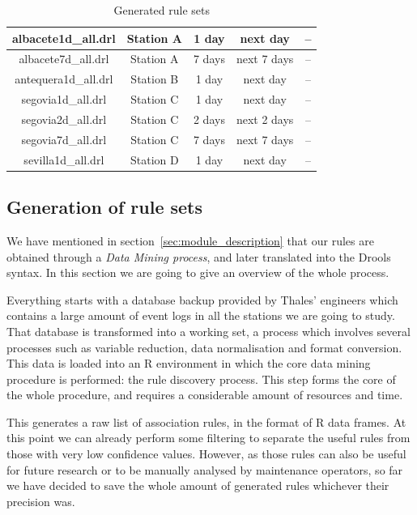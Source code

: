\begin{table}
\begin{center}
\begin{tabular}{|c|c|c|c|c|}
\hline
albacete1d\_all.drl & Station A & 1 day & next day & -- \\ 
\hline  
albacete7d\_all.drl & Station A & 7 days & next 7 days & -- \\ 
\hline 
antequera1d\_all.drl & Station B & 1 day & next day & -- \\ 
\hline 
segovia1d\_all.drl & Station C & 1 day & next day & -- \\ 
\hline
segovia2d\_all.drl & Station C & 2 days & next 2 days & -- \\  
\hline 
segovia7d\_all.drl & Station C & 7 days & next 7 days & -- \\  
\hline 
sevilla1d\_all.drl & Station D & 1 day & next day & -- \\ 
\hline

\end{tabular} 
\caption{Generated rule sets} \label{tab:ruleset_list}
\end{center}
\end{table}

\subsection{Generation of rule sets}
\label{sec:generation_of_rule_sets}

We have mentioned in section~\ref{sec:module_description} that our rules are obtained through a \emph{Data Mining process}, and later translated into the Drools syntax. In this section we are going to give an overview of the whole process.

Everything starts with a database backup provided by Thales' engineers which contains a large amount of event logs in all the stations we are going to study. That database is transformed into a working set, a process which involves several processes such as variable reduction, data normalisation and format conversion. This data is loaded into an R\cite{ihaka1996r, torgo2003data} environment in which the core data mining procedure is performed: the rule discovery process. This step forms the core of the whole procedure, and requires a considerable amount of resources and time.

This generates a raw list of association rules, in the format of R data frames. At this point we can already perform some filtering to separate the useful rules from those with very low confidence values. However, as those rules can also be useful for future research or to be manually analysed by maintenance operators, so far we have decided to save the whole amount of generated rules whichever their precision was.

